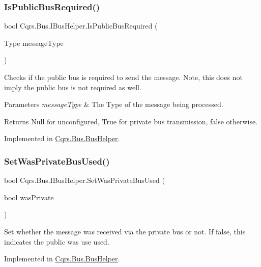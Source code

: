 \mbox{\label{interfaceCqrs_1_1Bus_1_1IBusHelper_a20c51abf04c3c0682fcb5da4c1a371ba_a20c51abf04c3c0682fcb5da4c1a371ba}} 
\subsubsection{\texorpdfstring{Is\+Public\+Bus\+Required()}{IsPublicBusRequired()}}
{\footnotesize\ttfamily bool Cqrs.\+Bus.\+I\+Bus\+Helper.\+Is\+Public\+Bus\+Required (\begin{DoxyParamCaption}\item[{Type}]{message\+Type }\end{DoxyParamCaption})}



Checks if the public bus is required to send the message. Note, this does not imply the public bus is not required as well. 


\begin{DoxyParams}{Parameters}
{\em message\+Type} & The Type of the message being processed.\\
\hline
\end{DoxyParams}
\begin{DoxyReturn}{Returns}
Null for unconfigured, True for private bus transmission, false otherwise.
\end{DoxyReturn}


Implemented in \hyperlink{classCqrs_1_1Bus_1_1BusHelper_ac5d953a97736424eff59b6033351be46_ac5d953a97736424eff59b6033351be46}{Cqrs.\+Bus.\+Bus\+Helper}.

\mbox{\label{interfaceCqrs_1_1Bus_1_1IBusHelper_a40a395ea6d92a6162c8e584a39284bbc_a40a395ea6d92a6162c8e584a39284bbc}} 
\subsubsection{\texorpdfstring{Set\+Was\+Private\+Bus\+Used()}{SetWasPrivateBusUsed()}}
{\footnotesize\ttfamily bool Cqrs.\+Bus.\+I\+Bus\+Helper.\+Set\+Was\+Private\+Bus\+Used (\begin{DoxyParamCaption}\item[{bool}]{was\+Private }\end{DoxyParamCaption})}



Set whether the message was received via the private bus or not. If false, this indicates the public was use used. 



Implemented in \hyperlink{classCqrs_1_1Bus_1_1BusHelper_ae243200364c620a2719b7be62d74eb7e_ae243200364c620a2719b7be62d74eb7e}{Cqrs.\+Bus.\+Bus\+Helper}.

